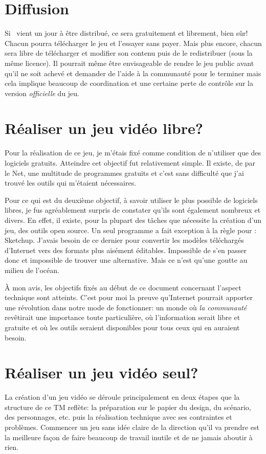 \printMiniToc

\section{Diffusion}
Si \nomJeu\ vient un jour à être distribué, ce sera gratuitement et librement, bien sûr! Chacun pourra télécharger le jeu et l'essayer sans payer. Mais plus encore, chacun sera libre de télécharger et modifier son contenu puis de le redistribuer (sous la même licence). Il pourrait même être envisageable de rendre le jeu public avant qu'il ne soit achevé et demander de l'aide à la communauté pour le terminer mais cela implique beaucoup de coordination et une certaine perte de contrôle sur la version \textit{officielle} du jeu.


\section{Réaliser un jeu vidéo libre?}
Pour la réalisation de ce jeu, je m'étais fixé comme condition de n'utiliser que des logiciels gratuits. Atteindre cet objectif fut relativement simple. Il existe, de par le Net, une multitude de programmes gratuits et c'est sans difficulté que j'ai trouvé les outils qui m'étaient nécessaires.

Pour ce qui est du deuxième objectif, à savoir utiliser le plus possible de logiciels libres, je fus agréablement surpris de constater qu'ils sont également nombreux et divers. En effet, il existe, pour la plupart des tâches que nécessite la création d'un jeu, des outils open source. Un seul programme a fait exception à la règle pour \nomJeu: Sketchup. J'avais besoin de ce dernier pour convertir les modèles téléchargés d'Internet vers des formats plus aisément éditables. Impossible de s'en passer donc et impossible de trouver une alternative. Mais ce n'est qu'une goutte au milieu de l'océan.

À mon avis, les objectifs fixés au début de ce document concernant l'aspect technique sont atteints. C'est pour moi la preuve qu'Internet pourrait apporter une révolution dans notre mode de fonctionner: un monde où \textit{la communauté} revêtirait une importance toute particulière, où l'information serait libre et gratuite et où les outils seraient disponibles pour tous ceux qui en auraient besoin.


\section{Réaliser un jeu vidéo seul?}
La création d'un jeu vidéo se déroule principalement en deux étapes que la structure de ce TM  reflète: la préparation sur le papier du design, du scénario, des personnages, etc. puis la réalisation technique avec ses contraintes et problèmes. Commencer un jeu sans idée claire de la direction qu'il va prendre est la meilleure façon de faire beaucoup de travail inutile et de ne jamais aboutir à rien.

